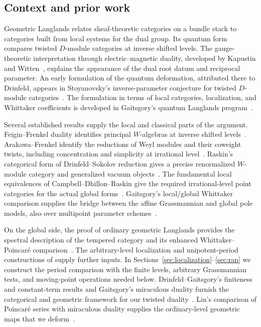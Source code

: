 \subsection{Context and prior work}

Geometric Langlands relates sheaf-theoretic categories on a bundle stack to
categories built from local systems for the dual group. Its quantum form
compares twisted $D$-module categories at inverse shifted levels. The
gauge-theoretic interpretation through electric--magnetic duality, developed
by Kapustin and Witten~\cite{KapustinWitten}, explains the appearance of the
dual root datum and reciprocal parameter. An early formulation of the
quantum deformation, attributed there to Drinfeld, appears in Stoyanovsky's
inverse-parameter conjecture for twisted $D$-module
categories~\cite[Section~1.3, Conjecture~2]{Stoyanovsky}. The formulation in
terms of local categories, localization, and Whittaker coefficients is
developed in Gaitsgory's quantum Langlands program~\cite{GaitsgoryQGL}.

Several established results supply the local and classical parts of the
argument. Feigin--Frenkel duality identifies principal $W$-algebras at inverse
shifted levels~\cite{FeiginFrenkel}. Arakawa--Frenkel identify the reductions of Weyl modules and
their coweight twists, including concentration and simplicity at irrational
level~\cite{ArakawaFrenkel}. Raskin's categorical form of
Drinfeld--Sokolov reduction gives a precise renormalized $W$-module category
and generalized vacuum objects~\cite{RaskinW}. The fundamental local
equivalences of Campbell--Dhillon--Raskin give the required irrational-level
point categories for the actual global forms~\cite{CDR}. Gaitsgory's
local/global Whittaker comparison supplies the bridge between the affine
Grassmannian and global pole models, also over multipoint parameter
schemes~\cite{GaitsgoryWhit}.

On the global side, the proof of ordinary geometric Langlands provides the
spectral description of the tempered category and its enhanced
Whittaker--Poincar\'e comparison~\cite{GLCI,GLCII,GLCIII,GLCIV,GLCV}.
The arbitrary-level localization and unipotent-period constructions of
\cite{GLCII} supply further inputs. In
Sections~\ref{sec:localization}--\ref{sec:ran} we construct the period
comparison with the finite levels, arbitrary Grassmannian tests, and
moving-point operations needed below.
Drinfeld--Gaitsgory's finiteness and
constant-term results and Gaitsgory's miraculous duality furnish the
categorical and geometric framework for our twisted
duality~\cite{DrinfeldGaitsgoryFiniteness,DrinfeldGaitsgoryCT,GaitsgoryStrange}.
Lin's comparison of Poincar\'e series with miraculous duality supplies the
ordinary-level geometric maps that we deform~\cite{Lin}.

